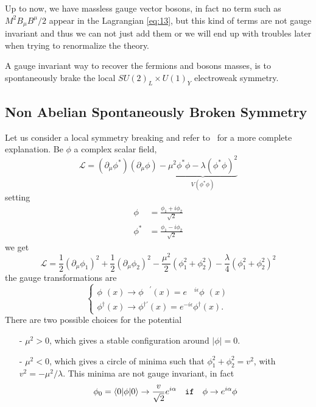 Up to now, we have massless gauge vector bosons, in fact no term such as
$M^{2} B_{\mu}B^{\mu} / 2$ appear in the Lagrangian \eqref{eq:13}, but this kind
of terms are not gauge invariant and thus we can not just add them or we will
end up with troubles later when trying to renormalize the theory.

A gauge invariant way to recover the fermions and bosons masses, is to
spontaneously brake the local $SU(2)_{L} \times U(1)_{Y}$ electroweak symmetry.

\subsection{Non Abelian Spontaneously Broken Symmetry}
\label{sec:non-abel-spont}
Let us consider a local symmetry breaking and refer to~\cite{martin:particle}
for a more complete explanation. Be $\phi$ a complex scalar field,
\begin{equation}
  \label{eq:25}
  \mathcal{L} = (\partial_{\mu} \phi^{*})(\partial_{\mu} \phi) -
  \underbrace{\mu^{2}\phi^{*}\phi - \lambda(\phi^{*}\phi)^{2}}_{V(\phi^{*}\phi)}
\end{equation}
setting
\begin{equation}
  \label{eq:26}
  \begin{split}
    \phi^{\phantom{*}} &= \frac{\phi_{1} + i \phi_{2}}{\sqrt{2}} \\
    \phi^{*} &= \frac{\phi_{1} - i \phi_{2}}{\sqrt{2}}
  \end{split}
\end{equation}
we get
\begin{equation}
  \label{eq:27}
  \mathcal{L} = \frac{1}{2} (\partial_{\mu} \phi_{1})^{2} +
  \frac{1}{2} ( \partial_{\mu} \phi_{2} )^{2} - \frac{\mu^{2}}{2} (
  \phi_{1}^{2} + \phi_{2}^{2} ) - \frac{\lambda}{4} ( \phi_{1}^{2} +
  \phi_{2}^{2} )^{2}
\end{equation}
the gauge transformations are
\begin{equation}
  \label{eq:28}
  \begin{cases}
    \phi^{\phantom{\dagger}}(x) \rightarrow \phi^{\phantom{\dagger}'}(x) =
    e^{\phantom{-} i \epsilon}
    \phi^{\phantom{\dagger}}(x) \\
    \phi^{\dagger} (x) \rightarrow \phi^{\dagger '} (x) = e^{- i \epsilon}
    \phi^{\dagger}(x).
  \end{cases}
\end{equation}
There are two possible choices for the potential
\begin{itemize}
\item[-] $\mu^{2} > 0$, which gives a stable configuration around $|\phi| = 0$.
\item[-] $\mu^{2} < 0$, which gives a circle of minima such that
  $\phi_{1}^{2} + \phi_{2}^{2} = v^{2}$, with $v^{2} = - \mu^{2} /
  \lambda$. This minima are not gauge invariant, in fact
  \begin{equation}
    \label{eq:29}
    \phi_{0} = \langle 0| \phi |0\rangle \rightarrow \frac{v}{\sqrt{2}} e^{i
      \alpha} \quad \mathtt{if} \quad \phi \rightarrow e^{i \alpha} \phi
  \end{equation}
\end{itemize}
